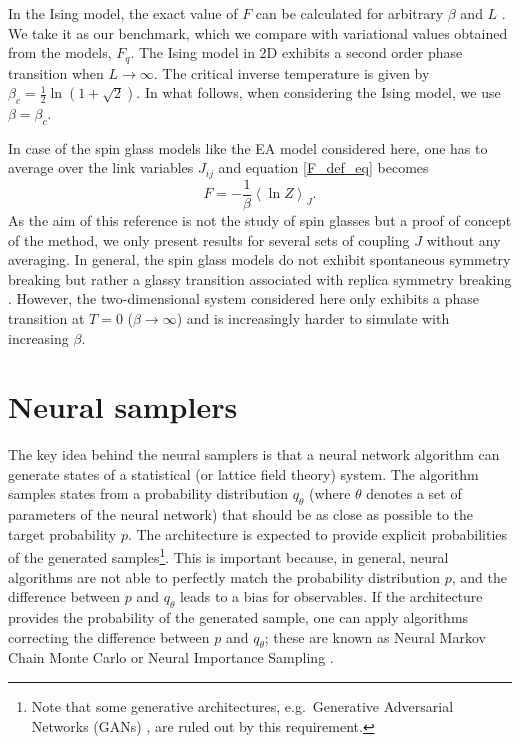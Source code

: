 \documentclass[3p, times,merge]{elsarticle}
\newcommand{\avg}[1]{\left\langle{#1}\right\rangle}
\begin{document}
In the Ising model, the exact value of $F$ can be calculated  for arbitrary $\beta$ and $L$ \cite{PhysRev.185.832}. We take it as our benchmark, which we compare with variational values obtained from the models, $F_q$. The Ising model in 2D exhibits a second order phase transition when $L\to\infty$. The critical inverse temperature is given by $\beta_c=\frac{1}{2}\ln(1+\sqrt{2})$. In what follows, when considering the Ising model, we use $\beta=\beta_c$.

In case of the spin glass models like the EA model considered here, one has to average over the link variables $J_{ij}$ and equation \eqref{F_def_eq} becomes
\begin{equation}
\label{eq:F-J}
F= -\frac{1}{\beta} \avg{\ln Z}_{J}.
\end{equation}
As the aim of this reference is not the study of spin glasses but a proof of concept of the method, we only present results for several sets of coupling $J$ without any averaging. In general, the spin glass models do not exhibit spontaneous symmetry breaking but rather a glassy transition associated with replica symmetry breaking \cite{Edwards_1975,Parisi1983}. However, the two-dimensional system considered here only exhibits a phase transition at $T=0$ ($\beta\rightarrow\infty$) \cite{PhysRevB.22.288} and is increasingly harder to simulate with increasing $\beta$.


\section{Neural samplers}
\label{sect_NS}

The key idea behind the neural samplers is that a neural network algorithm can generate states of a statistical (or lattice field theory) system. The algorithm samples states from a probability distribution $q_{\theta}$ (where $\theta$ denotes a set of parameters of the neural network) that should be as close as possible to the target probability $p$. The architecture is expected to provide explicit probabilities of the generated samples\footnote{Note that some generative architectures, e.g.~Generative Adversarial Networks (GANs) \cite{2014arXiv1406.2661G}, are ruled out by this requirement.}. This is important because, in general, neural algorithms are not able to perfectly match the probability distribution $p$, and the difference between $p$ and $q_\theta$ leads to a bias for observables. If the architecture provides the probability of the generated sample, one can apply algorithms correcting the difference between $p$ and $q_\theta$; these are known as Neural Markov Chain Monte Carlo \cite{PhysRevD.100.034515} or Neural Importance Sampling \cite{2020PhRvE.101b3304N}.
\end{document}

